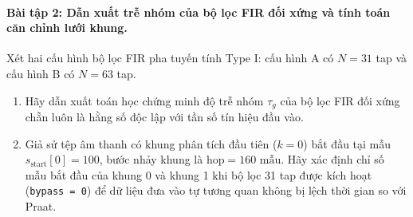 \paragraph{Bài tập 2: Dẫn xuất trễ nhóm của bộ lọc FIR đối xứng và tính toán căn chỉnh lưới khung.}
Xét hai cấu hình bộ lọc FIR pha tuyến tính Type I: cấu hình A có $N = 31$ tap và cấu hình B có $N = 63$ tap.
\begin{enumerate}[label=(\alph*)]
    \item Hãy dẫn xuất toán học chứng minh độ trễ nhóm $\tau_g$ của bộ lọc FIR đối xứng chẵn luôn là hằng số độc lập với tần số tín hiệu đầu vào.
    \item Giả sử tệp âm thanh có khung phân tích đầu tiên ($k = 0$) bắt đầu tại mẫu $s_{\text{start}}[0] = 100$, bước nhảy khung là $\text{hop} = 160\text{ mẫu}$. Hãy xác định chỉ số mẫu bắt đầu của khung 0 và khung 1 khi bộ lọc 31 tap được kích hoạt (\texttt{bypass = 0}) để dữ liệu đưa vào tự tương quan không bị lệch thời gian so với Praat.
\end{enumerate}

